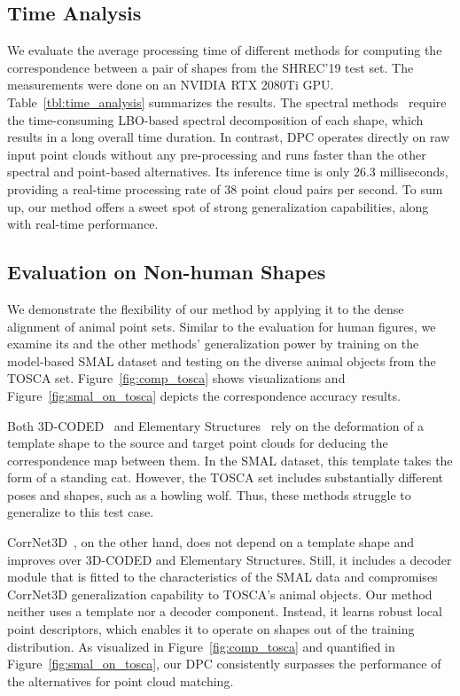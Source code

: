 \subsection{Time Analysis} \label{subsec:time_analysis}
We evaluate the average processing time of different methods for computing the correspondence between a pair of shapes from the SHREC'19 test set. The measurements were done on an NVIDIA RTX 2080Ti GPU. Table~\ref{tbl:time_analysis} summarizes the results. The spectral methods~\cite{roufosse2019unsupervised, donati2020deep} require the time-consuming LBO-based spectral decomposition of each shape, which results in a long overall time duration. In contrast, DPC operates directly on raw input point clouds without any pre-processing and runs faster than the other spectral and point-based alternatives. Its inference time is only 26.3 milliseconds, providing a real-time processing rate of 38 point cloud pairs per second. To sum up, our method offers a sweet spot of strong generalization capabilities, along with real-time performance.

\subsection{Evaluation on Non-human Shapes} \label{subsec:non_human_results}
We demonstrate the flexibility of our method by applying it to the dense alignment of animal point sets. Similar to the evaluation for human figures, we examine its and the other methods' generalization power by training on the model-based SMAL dataset and testing on the diverse animal objects from the TOSCA set. Figure~\ref{fig:comp_tosca} shows visualizations and Figure~\ref{fig:smal_on_tosca} depicts the correspondence accuracy results.



Both 3D-CODED~\cite{groueix20183dcoded} and Elementary Structures~\cite{deprelle2019learning} rely on the deformation of a template shape to the source and target point clouds for deducing the correspondence map between them. In the SMAL dataset, this template takes the form of a standing cat. However, the TOSCA set includes substantially different poses and shapes, such as a howling wolf. Thus, these methods struggle to generalize to this test case.



CorrNet3D~\cite{zeng2020corrnet3d}, on the other hand, does not depend on a template shape and improves over 3D-CODED and Elementary Structures. Still, it includes a decoder module that is fitted to the characteristics of the SMAL data and compromises CorrNet3D generalization capability to TOSCA's animal objects. Our method neither uses a template nor a decoder component. Instead, it learns robust local point descriptors, which enables it to operate on shapes out of the training distribution. As visualized in Figure~\ref{fig:comp_tosca} and quantified in Figure~\ref{fig:smal_on_tosca}, our DPC consistently surpasses the performance of the alternatives for point cloud matching.


